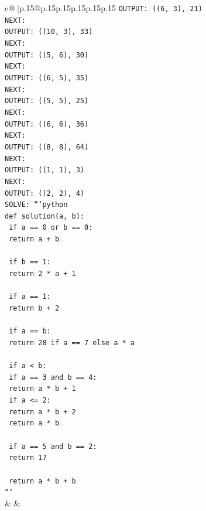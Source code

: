 \documentclass{article}
\begin{document}
{\begin{supertabular}{c@{$\;$}|p{.15\linewidth}@{}p{.15\linewidth}p{.15\linewidth}p{.15\linewidth}p{.15\linewidth}p{.15\linewidth}}
{{{\texttt{OUTPUT: ((6, 3), 21)} \\
\texttt{NEXT:} \\
\texttt{OUTPUT: ((10, 3), 33)} \\
\texttt{NEXT:} \\
\texttt{OUTPUT: ((5, 6), 30)} \\
\texttt{NEXT:} \\
\texttt{OUTPUT: ((6, 5), 35)} \\
\texttt{NEXT:} \\
\texttt{OUTPUT: ((5, 5), 25)} \\
\texttt{NEXT:} \\
\texttt{OUTPUT: ((6, 6), 36)} \\
\texttt{NEXT:} \\
\texttt{OUTPUT: ((8, 8), 64)} \\
\texttt{NEXT:} \\
\texttt{OUTPUT: ((1, 1), 3)} \\
\texttt{NEXT:} \\
\texttt{OUTPUT: ((2, 2), 4)} \\
\texttt{SOLVE: ```python} \\
\texttt{def solution(a, b):} \\
\texttt{    if a == 0 or b == 0:} \\
\texttt{        return a + b} \\
\\ 
\texttt{    if b == 1:} \\
\texttt{        return 2 * a + 1} \\
\\ 
\texttt{    if a == 1:} \\
\texttt{        return b + 2} \\
\\ 
\texttt{    if a == b:} \\
\texttt{        return 28 if a == 7 else a * a} \\
\\ 
\texttt{    if a < b:} \\
\texttt{        if a == 3 and b == 4:} \\
\texttt{            return a * b + 1} \\
\texttt{        if a <= 2:} \\
\texttt{            return a * b + 2} \\
\texttt{        return a * b} \\
\\ 
\texttt{    if a == 5 and b == 2:} \\
\texttt{        return 17} \\
\\ 
\texttt{    return a * b + b} \\
\texttt{```} \\
            }
        }
    }
    & & \\ \\


\end{supertabular}}
\end{document}
